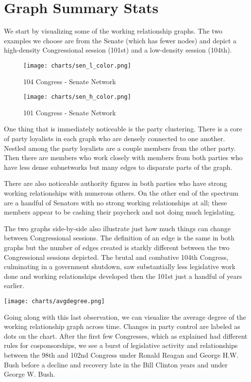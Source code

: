 \section{Graph Summary Stats}

We start by visualizing some of the working relationship graphs. The two
examples we choose are from the Senate (which has fewer nodes) and depict a
high-density Congressional session (101st) and a low-density session (104th).

\begin{figure}[htbp]
  \centering
  \begin{minipage}[h]{0.25\textwidth}
    \texttt{[image: charts/sen\_l\_color.png]}
    \caption*{104 Congress - Senate Network}
  \end{minipage}
  \hfill
  \begin{minipage}[h]{0.25\textwidth}
    \texttt{[image: charts/sen\_h\_color.png]}
    \caption*{101 Congress - Senate Network}
  \end{minipage}
\end{figure}

One thing that is immediately noticeable is the party clustering. There is a
core of party loyalists in each graph who are densely connected to one another.
Nestled among the party loyalists are a couple members from the other party.
Then there are members who work closely with members from both parties who have
less dense subnetworks but many edges to disparate parts of the graph.

There are also noticeable authority figures in both parties who have strong
working relationships with numerous others. On the other end of the spectrum are
a handful of Senators with no strong working relationships at all; these members
appear to be cashing their paycheck and not doing much legislating.

The two graphs side-by-side also illustrate just how much things can change
between Congressional sessions. The definition of an edge is the same in both
graphs but the number of edges created is starkly different between the two
Congressional sessions depicted. The brutal and combative 104th Congress,
culminating in a government shutdown, saw substantially less legislative work
done and working relationships developed then the 101st just a handful of years
earlier.

\texttt{[image: charts/avgdegree.png]}

Going along with this last observation, we can visualize the average degree of
the working relationship graph across time. Changes in party control are labeled
as dots on the chart. After the first few Congresses, which as explained had
different rules for cosponsorships, we see a burst of legislative activity and
relationships between the 98th and 102nd Congress under Ronald Reagan and George
H.W. Bush before a decline and recovery late in the Bill Clinton years and under
George W. Bush.

